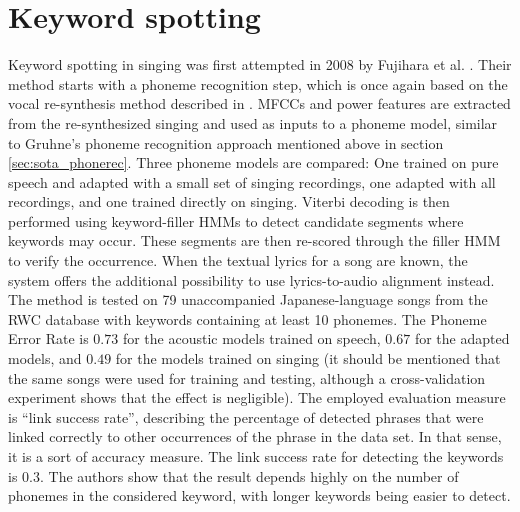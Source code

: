 \section{Keyword spotting}
Keyword spotting in singing was first attempted in 2008 by Fujihara et al. \cite{hyperlinking_lyrics}. Their method starts with a phoneme recognition step, which is once again based on the vocal re-synthesis method described in \cite{fujihara_identification}. MFCCs and power features are extracted from the re-synthesized singing and used as inputs to a phoneme model, similar to Gruhne's phoneme recognition approach mentioned above in section \ref{sec:sota_phonerec}.  Three phoneme models are compared: One trained on pure speech and adapted with a small set of singing recordings, one adapted with all recordings, and one trained directly on singing. Viterbi decoding is then performed using keyword-filler HMMs to detect candidate segments where keywords may occur. These segments are then re-scored through the filler HMM to verify the occurrence. When the textual lyrics for a song are known, the system offers the additional possibility to use lyrics-to-audio alignment instead.\\
The method is tested on 79 unaccompanied Japanese-language songs from the RWC database \cite{rwc} with keywords containing at least 10 phonemes. The Phoneme Error Rate is $0.73$ for the acoustic models trained on speech, $0.67$ for the adapted models, and $0.49$ for the models trained on singing (it should be mentioned that the same songs were used for training and testing, although a cross-validation experiment shows that the effect is negligible). The employed evaluation measure is ``link success rate'', describing the percentage of detected phrases that were linked correctly to other occurrences of the phrase in the data set. In that sense, it is a sort of accuracy measure. The link success rate for detecting the keywords is $0.3$. The authors show that the result depends highly on the number of phonemes in the considered keyword, with longer keywords being easier to detect.\\

